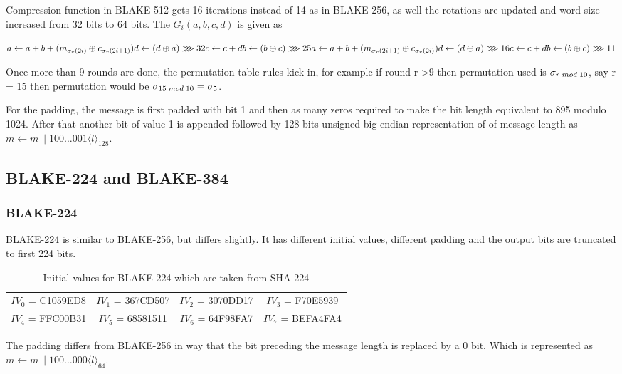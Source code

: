   Compression function in BLAKE-512 gets 16 iterations instead of 14 as in BLAKE-256, as well the rotations
  are updated and word size increased from 32 bits to 64 bits. The $G_{i}(a, b, c, d)$ 
  is given as 

  $
  a \gets a + b + (m_{\sigma_{r}(2i)} \oplus c_{\sigma_{r}(2i + 1)}) \\
  d \gets (d \oplus a) \ggg 32 \\
  c \gets c + d \\
  b \gets (b \oplus c) \ggg 25 \\
  a \gets a + b + (m_{\sigma_{r}(2i + 1)} \oplus c_{\sigma_{r}(2i)}) \\
  d \gets (d \oplus a) \ggg 16 \\
  c \gets c + d \\
  b \gets (b \oplus c) \ggg 11
  $
  
  Once more than 9 rounds are done, the permutation table rules kick in, for example if round r \textgreater 9 then
  permutation used is $\sigma_{r \thickspace mod \thickspace 10}$, say r = 15 then permutation would be 
  $\sigma_{15 \thickspace mod \thickspace 10} = \sigma_{5}$.

  For the padding, the message is first padded with bit 1 and then as many zeros required to make the bit length
  equivalent to 895 modulo 1024. After that another bit of value 1 is appended followed by 128-bits unsigned big-endian
  representation of of message length as $m \gets m \parallel 100 \dots 001 \langle l \rangle_{128}$.

\subsection{BLAKE-224 and BLAKE-384}

  \subsubsection{BLAKE-224}
  BLAKE-224 is similar to BLAKE-256, but differs slightly. It has different initial values, different padding and the
  output bits are truncated to first 224 bits.
  \begin{table}[h]
    \begin{center}
      \begin{tabular}{ *{4}{c}}
        $IV_{0}$ = C1059ED8 & $IV_{1}$ = 367CD507 & $IV_{2}$ = 3070DD17 & $IV_{3}$ = F70E5939 \\
        $IV_{4}$ = FFC00B31 & $IV_{5}$ = 68581511 & $IV_{6}$ = 64F98FA7 & $IV_{7}$ = BEFA4FA4 \\
      \end{tabular}
      \caption{Initial values for BLAKE-224 which are taken from SHA-224\cite{00002}}
    \end{center}
  \end{table}
  The padding differs from BLAKE-256 in way that the bit preceding the message length is replaced by a 0 bit. Which
  is represented as $m \gets m \parallel 100 \dots 000 \langle l \rangle_{64}$.

